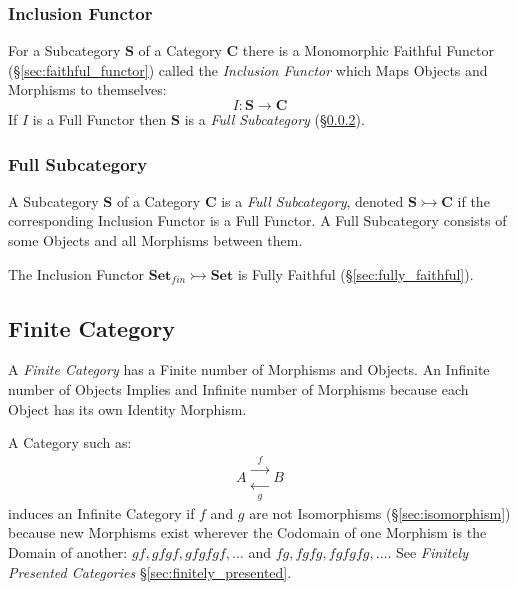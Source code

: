 \subsubsection{Inclusion Functor}\label{sec:inclusion_functor}

For a Subcategory $\mathbf{S}$ of a Category $\mathbf{C}$ there is a
Monomorphic Faithful Functor (\S\ref{sec:faithful_functor}) called the
\emph{Inclusion Functor} which Maps Objects and Morphisms to
themselves:
\[
  I : \mathbf{S} \rightarrow \mathbf{C}
\]
If $I$ is a Full Functor then $\mathbf{S}$ is a \emph{Full
  Subcategory} (\S\ref{sec:full_subcategory}).



\subsubsection{Full Subcategory}\label{sec:full_subcategory}

A Subcategory $\mathbf{S}$ of a Category $\mathbf{C}$ is a \emph{Full
  Subcategory}, denoted $\mathbf{S} \rightarrowtail \mathbf{C}$ if the
corresponding Inclusion Functor is a Full Functor. A Full Subcategory
consists of some Objects and all Morphisms between them.

The Inclusion Functor $\mathbf{Set}_{fin} \rightarrowtail
\mathbf{Set}$ is Fully Faithful (\S\ref{sec:fully_faithful}).



\subsection{Finite Category}\label{sec:finite_category}

A \emph{Finite Category} has a Finite number of Morphisms and
Objects. An Infinite number of Objects Implies and Infinite number of
Morphisms because each Object has its own Identity Morphism.

A Category such as:
\[
  A
  \begin{matrix}
  \xrightarrow{\;\;f\;\;}\\
  \xleftarrow[\;\;g\;\;]{}
  \end{matrix}
  B
\]
induces an Infinite Category if $f$ and $g$ are not Isomorphisms
(\S\ref{sec:isomorphism}) because new Morphisms exist wherever the
Codomain of one Morphism is the Domain of another: $gf, gfgf, gfgfgf,
\ldots$ and $fg, fgfg, fgfgfg, \ldots$. See \emph{Finitely Presented
  Categories} \S\ref{sec:finitely_presented}.



